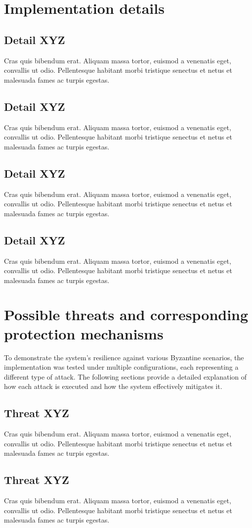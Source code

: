 \documentclass[runningheads]{llncs}
\begin{document}
\section{Implementation details}
\subsection{Detail XYZ}
Cras quis bibendum erat. Aliquam massa tortor, euismod a venenatis eget,
convallis ut odio. Pellentesque habitant morbi tristique senectus et netus et
malesuada fames ac turpis egestas.
%
\subsection{Detail XYZ}
Cras quis bibendum erat. Aliquam massa tortor, euismod a venenatis eget,
convallis ut odio. Pellentesque habitant morbi tristique senectus et netus et
malesuada fames ac turpis egestas.
%
\subsection{Detail XYZ}
Cras quis bibendum erat. Aliquam massa tortor, euismod a venenatis eget,
convallis ut odio. Pellentesque habitant morbi tristique senectus et netus et
malesuada fames ac turpis egestas.
%
\subsection{Detail XYZ}
Cras quis bibendum erat. Aliquam massa tortor, euismod a venenatis eget,
convallis ut odio. Pellentesque habitant morbi tristique senectus et netus et
malesuada fames ac turpis egestas.
%
\section{Possible threats and corresponding protection mechanisms} To
demonstrate the system's resilience against various Byzantine scenarios, the
implementation was tested under multiple configurations, each representing a
different type of attack. The following sections provide a detailed explanation
of how each attack is executed and how the system effectively mitigates it.
\subsection{Threat XYZ}
Cras quis bibendum erat. Aliquam massa tortor, euismod a venenatis eget,
convallis ut odio. Pellentesque habitant morbi tristique senectus et netus et
malesuada fames ac turpis egestas.
%
\subsection{Threat XYZ}
Cras quis bibendum erat. Aliquam massa tortor, euismod a venenatis eget,
convallis ut odio. Pellentesque habitant morbi tristique senectus et netus et
malesuada fames ac turpis egestas.
%
\end{document}
